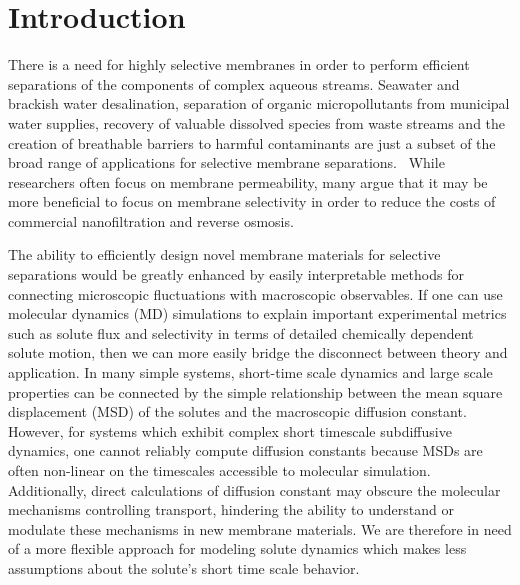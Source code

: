 \documentclass[journal=jpcbfk,manuscript=article]{achemso}
\begin{document}
  \section{Introduction}
  
  There is a need for highly selective membranes in order to perform efficient 
  separations of the components of complex aqueous streams. Seawater and
  brackish water desalination, separation of organic micropollutants from 
  municipal water supplies, recovery of valuable dissolved species from 
  waste streams and the creation of breathable barriers to harmful contaminants are just a
  subset of the broad range of applications for selective membrane separations.~\cite{fritzmann_state---art_2007,fonseca_couto_critical_2018,dischinger_evaluation_2019,ramaseshan_functionalized_2006}
  While researchers often focus on membrane permeability, many argue that
  it may be more beneficial to focus on membrane selectivity in order to 
  reduce the costs of commercial nanofiltration and reverse osmosis.~\cite{werber_materials_2016}
  
  The ability to efficiently design novel membrane materials for selective separations 
  would be greatly enhanced by easily interpretable methods for connecting microscopic
  fluctuations with macroscopic observables. If one can use molecular dynamics (MD)
  simulations to explain important experimental metrics such as solute flux and 
  selectivity in terms of detailed chemically dependent solute motion, then we can 
  more easily bridge the disconnect between theory and application. In many simple 
  systems, short-time scale dynamics and large scale properties can be connected by
  the simple relationship between the mean square displacement (MSD) of the solutes
  and the macroscopic diffusion constant. However, for systems which exhibit complex 
  short timescale subdiffusive dynamics, one cannot reliably compute diffusion 
  constants because MSDs are often non-linear on the timescales accessible to molecular
  simulation. Additionally, direct calculations of diffusion constant may obscure the
  molecular mechanisms controlling transport, hindering the ability to understand or 
  modulate these mechanisms in new membrane materials. We are therefore in need of a 
  more flexible approach for modeling solute dynamics which makes less assumptions 
  about the solute's short time scale behavior.
\end{document}
